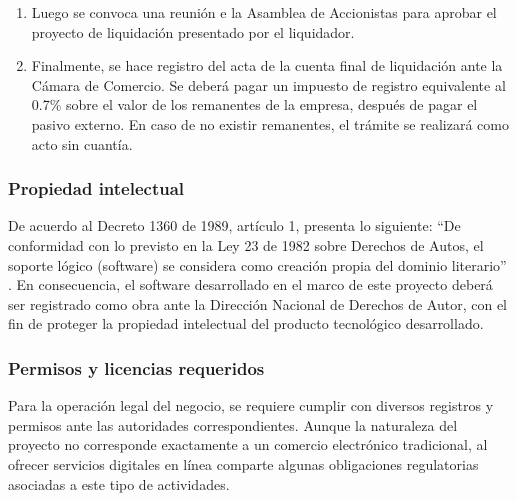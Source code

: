 \begin{enumerate}
\begin{itemize}
		\item Relación de los pasivos de la entidad.
		
		\item Estado de cuentas a la DIAN.
		
		\item Pago de pasivos.
		
		\item Indicación del remanente.
		
		\item Destinación del remanente.
	\end{itemize}
	
	\item Luego se convoca una reunión e la Asamblea de Accionistas para aprobar el proyecto de liquidación presentado por el liquidador.
	
	\item Finalmente, se hace registro del acta de la cuenta final de liquidación ante la Cámara de Comercio. Se deberá pagar un impuesto de registro equivalente al 0.7\% sobre el valor de los remanentes de la empresa, después de pagar el pasivo externo. En caso de no existir remanentes, el trámite se realizará como acto sin cuantía.
\end{enumerate}

\subsubsection*{Propiedad intelectual}

De acuerdo al Decreto 1360 de 1989, artículo 1, presenta lo siguiente: ``De conformidad con lo previsto en la Ley 23 de 1982 sobre Derechos de Autos, el soporte lógico (software) se considera como creación propia del dominio literario'' \parencite{Ley1360}. En consecuencia, el software desarrollado en el marco de este proyecto deberá ser registrado como obra ante la Dirección Nacional de Derechos de Autor, con el fin de proteger la propiedad intelectual del producto tecnológico desarrollado.

\subsubsection*{Permisos y licencias requeridos}

Para la operación legal del negocio, se requiere cumplir con diversos registros y permisos ante las autoridades correspondientes. Aunque la naturaleza del proyecto no corresponde exactamente a un comercio electrónico tradicional, al ofrecer servicios digitales en línea comparte algunas obligaciones regulatorias asociadas a este tipo de actividades.

